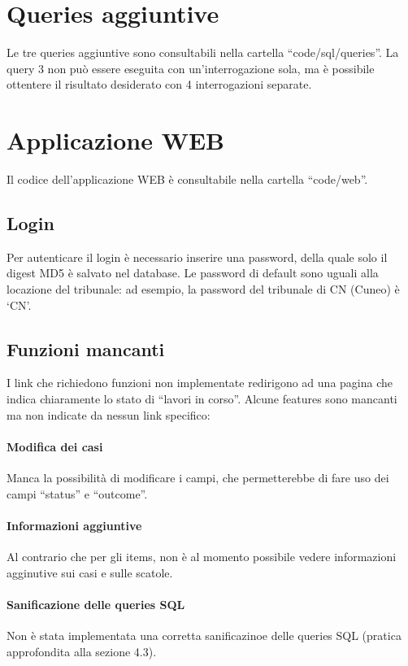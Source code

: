 {\section{Queries aggiuntive}

Le tre queries aggiuntive sono consultabili nella cartella ``code/sql/queries''. La query 3 non può essere eseguita con un'interrogazione sola, ma è possibile ottentere il risultato desiderato con 4 interrogazioni separate.

\section{Applicazione WEB}

Il codice dell'applicazione WEB è consultabile nella cartella ``code/web''.

\subsection{Login}

Per autenticare il login è necessario inserire una password, della quale solo il digest MD5 è salvato nel database. Le password di default sono uguali alla locazione del tribunale: ad esempio, la password del tribunale di CN (Cuneo) è `CN'.

\subsection{Funzioni mancanti}

I link che richiedono funzioni non implementate redirigono ad una pagina che indica chiaramente lo stato di ``lavori in corso''. Alcune features sono mancanti ma non indicate da nessun link specifico:

\paragraph{Modifica dei casi}
Manca la possibilità di modificare i campi, che permetterebbe di fare uso dei campi ``status'' e ``outcome''.

\paragraph{Informazioni aggiuntive}
Al contrario che per gli items, non è al momento possibile vedere informazioni agginutive sui casi e sulle scatole.

\paragraph{Sanificazione delle queries SQL}
Non è stata implementata una corretta sanificazinoe delle queries SQL (pratica approfondita alla sezione 4.3).

}
